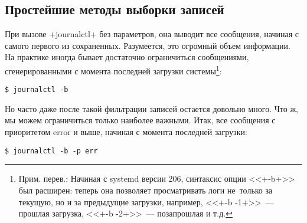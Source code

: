 \documentclass[10pt,oneside,a4paper]{article}
\begin{document}
\subsection{Простейшие методы выборки записей}

При вызове +journalctl+ без параметров, она выводит все сообщения, начиная с
самого первого из сохраненных. Разумеется, это огромный объем информации. На
практике иногда бывает достаточно ограничиться сообщениями, сгенерированными с
момента последней загрузки системы\footnote{Прим. перев.: Начиная с systemd
версии 206, синтаксис опции <<+-b+>> был расширен: теперь она позволяет
просматривать логи не~только за текущую, но и за предыдущие загрузки, например,
<<+-b -1+>>~--- прошлая загрузка, <<+-b -2+>>~--- позапрошлая и т.д.}:
\begin{Verbatim}
$ journalctl -b
\end{Verbatim}
Но часто даже после такой фильтрации записей остается довольно много. Что ж, мы
можем ограничиться только наиболее важными. Итак, все сообщения с приоритетом
error и выше, начиная с момента последней загрузки:
\begin{Verbatim}
$ journalctl -b -p err
\end{Verbatim}
\end{document}
